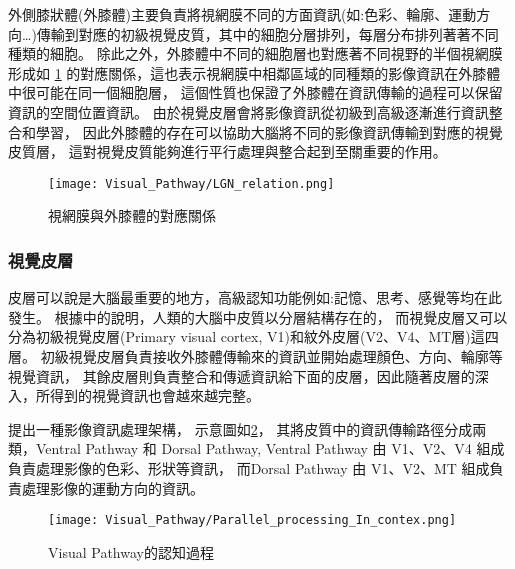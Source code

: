 \documentclass[class=NCU_thesis, crop=false]{standalone}
\begin{document}
外側膝狀體(外膝體)主要負責將視網膜不同的方面資訊(如:色彩、輪廓、運動方向…)傳輸到對應的初級視覺皮質，其中的細胞分層排列，每層分布排列著著不同種類的細胞。
除此之外，外膝體中不同的細胞層也對應著不同視野的半個視網膜形成如 \cref{fig:LGN_Relation}
的對應關係，這也表示視網膜中相鄰區域的同種類的影像資訊在外膝體中很可能在同一個細胞層，
這個性質也保證了外膝體在資訊傳輸的過程可以保留資訊的空間位置資訊。
由於視覺皮層會將影像資訊從初級到高級逐漸進行資訊整合和學習，
因此外膝體的存在可以協助大腦將不同的影像資訊傳輸到對應的視覺皮質層，
這對視覺皮質能夠進行平行處理與整合起到至關重要的作用。

\begin{figure}[H]
  \centering
  \texttt{[image: Visual\_Pathway/LGN\_relation.png]}
  \caption{視網膜與外膝體的對應關係~\cite{bear2016neuroscience}}
  \label{fig:LGN_Relation}
\end{figure}
\pagebreak

\subsubsection{視覺皮層}
皮層可以說是大腦最重要的地方，高級認知功能例如:記憶、思考、感覺等均在此發生。
根據\cite{1180370208}中的說明，人類的大腦中皮質以分層結構存在的，
而視覺皮層又可以分為初級視覺皮層(Primary visual cortex, V1)和紋外皮層(V2、V4、MT層)這四層。
初級視覺皮層負責接收外膝體傳輸來的資訊並開始處理顏色、方向、輪廓等視覺資訊，
其餘皮層則負責整合和傳遞資訊給下面的皮層，因此隨著皮層的深入，所得到的視覺資訊也會越來越完整。

\cite{1180370208}提出一種影像資訊處理架構，
示意圖如\cref{fig:ParallelProcess}，
其將皮質中的資訊傳輸路徑分成兩類，Ventral Pathway 和 Dorsal Pathway, 
Ventral Pathway 由 V1、V2、V4 組成負責處理影像的色彩、形狀等資訊，
而Dorsal Pathway 由 V1、V2、MT 組成負責處理影像的運動方向的資訊。

\begin{figure}[H]
  \centering
  \texttt{[image: Visual\_Pathway/Parallel\_processing\_In\_contex.png]}
  \caption{Visual Pathway的認知過程~\cite{1180370208}}
  \label{fig:ParallelProcess}
\end{figure}

\end{document}
